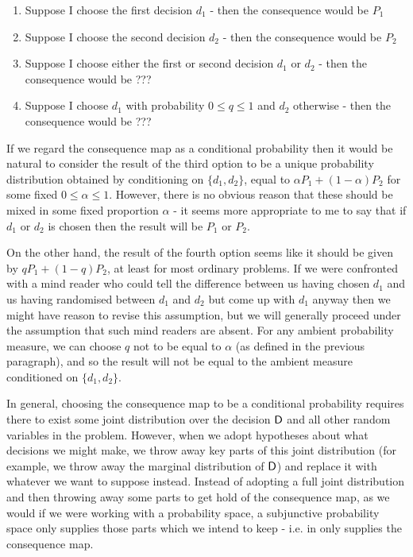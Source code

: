 \begin{enumerate}
	\item Suppose I choose the first decision $d_1$ - then the consequence would be $P_1$
	\item Suppose I choose the second decision $d_2$ - then the consequence would be $P_2$
	\item Suppose I choose either the first or second decision $d_1$ or $d_2$ - then the consequence would be ???
	\item Suppose I choose $d_1$ with probability $0\leq q\leq 1$ and $d_2$ otherwise - then the consequence would be ???
\end{enumerate}

If we regard the consequence map as a conditional probability then it would be natural to consider the result of the third option to be a unique probability distribution obtained by conditioning on $\{d_1,d_2\}$, equal to  $\alpha P_1 + (1-\alpha)P_2$ for some fixed $0\leq \alpha\leq 1$. However, there is no obvious reason that these should be mixed in some fixed proportion $\alpha$ - it seems more appropriate to me to say that if $d_1$ or $d_2$ is chosen then the result will be $P_1$ or $P_2$.

On the other hand, the result of the fourth option seems like it should be given by $q P_1 + (1-q) P_2$, at least for most ordinary problems. If we were confronted with a mind reader who could tell the difference between us having chosen $d_1$ and us having randomised between $d_1$ and $d_2$ but come up with $d_1$ anyway then we might have reason to revise this assumption, but we will generally proceed under the assumption that such mind readers are absent. For any ambient probability measure, we can choose $q$ not to be equal to $\alpha$ (as defined in the previous paragraph), and so the result will not be equal to the ambient measure conditioned on $\{d_1,d_2\}$. 

In general, choosing the consequence map to be a conditional probability requires there to exist some joint distribution over the decision $\mathsf{D}$ and all other random variables in the problem. However, when we adopt hypotheses about what decisions we might make, we throw away key parts of this joint distribution (for example, we throw away the marginal distribution of $\mathsf{D}$) and replace it with whatever we want to suppose instead. Instead of adopting a full joint distribution and then throwing away some parts to get hold of the consequence map, as we would if we were working with a probability space, a subjunctive probability space only supplies those parts which we intend to keep - i.e. in only supplies the consequence map.
